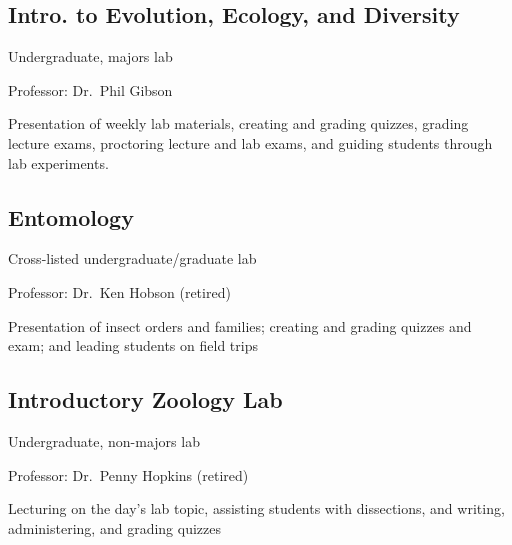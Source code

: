 \documentclass[
  letterpaper,
  DIV=11,
  numbers=noendperiod,
  oneside]{scrreprt}
\begin{document}
\subsection{Intro. to Evolution, Ecology, and
Diversity}\label{intro.-to-evolution-ecology-and-diversity}

Undergraduate, majors lab


Professor: Dr.~Phil Gibson

Presentation of weekly lab materials, creating and grading quizzes,
grading lecture exams, proctoring lecture and lab exams, and guiding
students through lab experiments.

\subsection{Entomology}\label{sec-teach-ento}

Cross-listed undergraduate/graduate lab


Professor: Dr.~Ken Hobson (retired)

Presentation of insect orders and families; creating and grading quizzes
and exam; and leading students on field trips

\subsection{Introductory Zoology Lab}\label{introductory-zoology-lab}

Undergraduate, non-majors lab


Professor: Dr.~Penny Hopkins (retired)

Lecturing on the day's lab topic, assisting students with dissections,
and writing, administering, and grading quizzes
\end{document}
